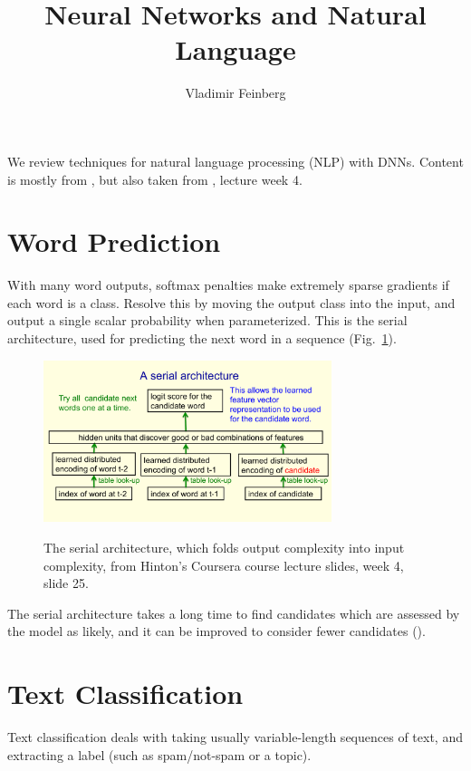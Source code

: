 \documentclass{article}
\title{Neural Networks and Natural Language}
\author{Vladimir Feinberg}
\begin{document}
\maketitle

We review techniques for natural language processing (NLP) with DNNs. Content is mostly from , but also taken from , lecture week 4.

\section{Word Prediction}

With many word outputs, softmax penalties make extremely sparse gradients if each word is a class. Resolve this by moving the output class into the input, and output a single scalar probability when parameterized. This is the serial architecture, used for predicting the next word in a sequence (Fig.~\ref{fig:serial}).
\begin{figure}[!h]
\centering
{\includegraphics[width=0.75\textwidth]{hinton-serial.pdf}}
  \caption{The serial architecture, which folds output complexity into input complexity, from Hinton's Coursera course lecture slides, week 4, slide 25.}
\label{fig:serial}
\end{figure}
The serial architecture takes a long time to find candidates which are assessed by the model as likely, and it can be improved to consider fewer candidates ().

\section{Text Classification}

Text classification deals with taking usually variable-length sequences of text, and extracting a label (such as spam/not-spam or a topic).
\end{document}
